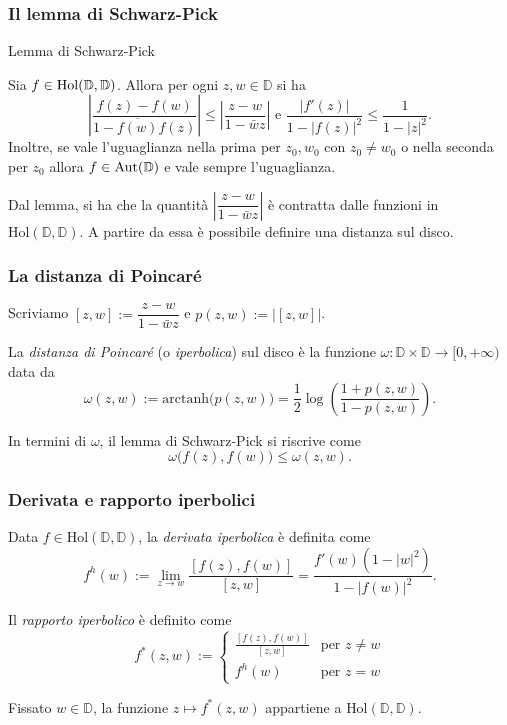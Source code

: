 \begin{frame}
  \frametitle{Il lemma di Schwarz-Pick}
  \begin{block}{Lemma di Schwarz-Pick} \label{SP}
    \begin{itshape}
      Sia $f \in \text{\normalfont{Hol}}(\mathbb{D},\mathbb{D})$. Allora per ogni $z, w \in \mathbb{D}$ si ha
      $$\left|\frac{f(z)-f(w)}{1-\overline{f(w)}f(z)}\right| \le \left|\frac{z-w}{1-\bar{w}z}\right| \text{ e } \frac{|f'(z)|}{1-|f(z)|^2} \le \frac{1}{1-|z|^2}.$$
      Inoltre, se vale l'uguaglianza nella prima per $z_0, w_0$ con $z_0 \not=w_0$ o nella seconda per $z_0$ allora $f \in \text{\normalfont{Aut}}(\mathbb{D})$ e vale sempre l'uguaglianza.
    \end{itshape}
  \end{block}
  \pause
  Dal lemma, si ha che la quantità $\left|\dfrac{z-w}{1-\bar{w}z}\right|$ è contratta dalle funzioni in $\text{Hol}(\mathbb{D},\mathbb{D})$. A partire da essa è possibile definire una distanza sul disco.
\end{frame}

\begin{frame}
  \frametitle{La distanza di Poincaré}
  Scriviamo $[z,w]:=\dfrac{z-w}{1-\bar{w}z}$ e $p(z,w):=|[z,w]|$. \pause
  \begin{defn}
    La \textit{distanza di Poincaré} (o \textit{iperbolica}) sul disco è la funzione $\omega:\mathbb{D}\times \mathbb{D} \longrightarrow [0,+\infty)$ data da
    $$\omega(z,w):=\text{arctanh}\bigl(p(z,w)\bigr)=\frac{1}{2}\log\left(\frac{1+p(z,w)}{1-p(z,w)}\right).$$
  \end{defn}
  \pause
  In termini di $\omega$, il lemma di Schwarz-Pick si riscrive come
  $$\omega\bigl(f(z),f(w)\bigr) \le \omega(z,w).$$
\end{frame}

\begin{frame}
  \frametitle{Derivata e rapporto iperbolici}
  \begin{defn}
    Data $f \in \text{Hol}(\mathbb{D},\mathbb{D})$, la \textit{derivata iperbolica} è definita come
    $$f^h(w):=\lim_{z \longrightarrow w} \frac{[f(z),f(w)]}{[z,w]}=\frac{f'(w)(1-|w|^2)}{1-|f(w)|^2}.$$
  \end{defn}
  \pause
  \begin{defn}
    Il \textit{rapporto iperbolico} è definito come
    $$f^*(z,w):=\begin{cases}
      \frac{[f(z),f(w)]}{[z,w]} & \mbox{per }z\not=w \\
      f^h(w) & \mbox{per }z=w
    \end{cases}$$
  \end{defn}
  \pause
  Fissato $w \in \mathbb{D}$, la funzione $z \longmapsto f^*(z,w)$ appartiene a $\text{Hol}(\mathbb{D},\mathbb{D})$.
\end{frame}
